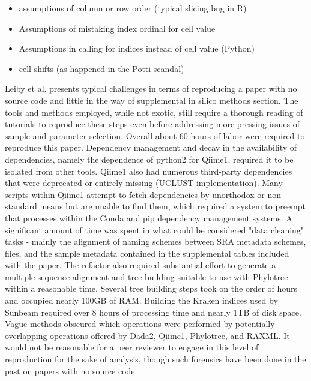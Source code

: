 \documentclass{drexelthesis}
\begin{document}
\begin{itemize}
	\item assumptions of column or row order (typical slicing bug in R)

	\item Assumptions of mistaking index ordinal for cell value

	\item Assumptions in calling for indices instead of cell value (Python)

	\item cell shifts (as happened in the Potti scandal)

\end{itemize}
Leiby et al. presents typical challenges in terms of reproducing a paper with no source code and little in the way of supplemental in silico methods section. The tools and methods employed, while not exotic, still require a thorough reading of tutorials to reproduce these steps even before addressing more pressing issues of sample and parameter selection. Overall about 60 hours of labor were required to reproduce this paper. Dependency management and decay in the availability of dependencies, namely the dependence of python2 for Qiime1, required it to be isolated from other tools. Qiime1 also had numerous third-party dependencies that were deprecated or entirely missing (UCLUST implementation). Many scripts within Qiime1 attempt to fetch dependencies by unorthodox or non-standard means but are unable to find them, which required a system to preempt that processes within the Conda and pip dependency management systems. A significant amount of time was spent in what could be considered "data cleaning" tasks - mainly the alignment of naming schemes between SRA metadata schemes, files, and the sample metadata contained in the supplemental tables included with the paper. The refactor also required substantial effort to generate a multiple sequence alignment and tree building suitable to use with Phylotree within a reasonable time. Several tree building steps took on the order of hours and occupied nearly 100GB of RAM. Building the Kraken indices used by Sunbeam required over 8 hours of processing time and nearly 1TB of disk space. Vague methods obscured which operations were performed by potentially overlapping operations offered by Dada2, Qiime1, Phylotree, and RAXML. It would not be reasonable for a peer reviewer to engage in this level of reproduction for the sake of analysis, though such forensics have been done in the past on papers with no source code.
\end{document}
